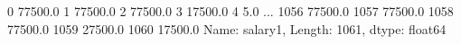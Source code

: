 0       77500.0
1       77500.0
2       77500.0
3       17500.0
4           5.0
         ...   
1056    77500.0
1057    77500.0
1058    77500.0
1059    27500.0
1060    17500.0
Name: salary1, Length: 1061, dtype: float64
